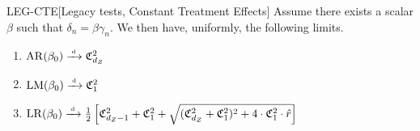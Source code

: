 \begin{lemmap}{LEG-CTE}[Legacy tests, Constant Treatment Effects]\label{lem:leg-cte}
Assume there exists a scalar \(\beta\) such that \(\delta_n=\beta \gamma_n\). We then have, uniformly, the following limits.
    \begin{enumerate}
        \item
        \(\mathrm{AR}(\beta_0)\xrightarrow{{\scriptscriptstyle \mathrm{\;d\;}}} \mathfrak{C}^2_{d_Z}\)
        \item
        \(\mathrm{LM}(\beta_0)\xrightarrow{{\scriptscriptstyle \mathrm{\;d\;}}} \mathfrak{C}^2_1\)
        \item
        \(\mathrm{LR}(\beta_0)\xrightarrow{{\scriptscriptstyle \mathrm{\;d\;}}} \frac{1}{2}\left[\mathfrak{C}^2_{d_Z-1}+\mathfrak{C}^2_1 + \sqrt{(\mathfrak{C}^2_{d_Z}+\mathfrak{C}^2_1)^2 + 4 \cdot \mathfrak{C}^2_1 \cdot \hat r} \right]\)
    \end{enumerate}
\end{lemmap}
